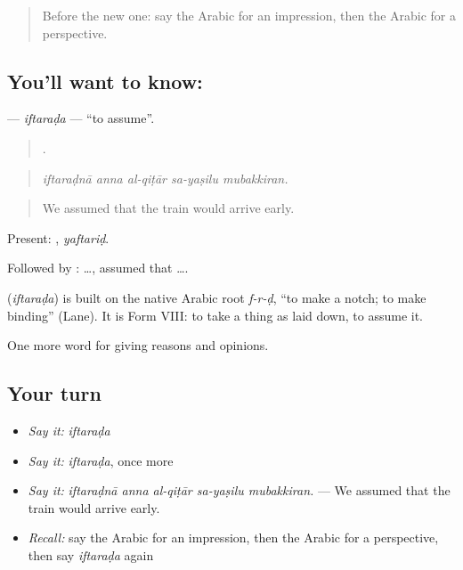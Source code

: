 \label{lesson:AR-C359-iftarada}



\begin{quote}
Before the new one: say the Arabic for an impression, then the Arabic for a perspective.
\end{quote}

\subsection*{You'll want to know: }
\textbf{} — \emph{iftaraḍa} — \textquotedblleft{}to assume\textquotedblright{}.

\begin{quote}
    .
\end{quote}

\begin{quote}
\emph{iftaraḍnā anna al-qiṭār sa-yaṣilu mubakkiran.}
\end{quote}

\begin{quote}
We assumed that the train would arrive early.
\end{quote}

Present: , \emph{yaftariḍ}.

Followed by :   …, assumed that ….

\begin{cousinweb}
\textbf{} (\emph{iftaraḍa}) is built on the native Arabic root \emph{f-r-ḍ}, \textquotedblleft{}to make a notch; to make binding\textquotedblright{} (Lane). It is Form VIII: to take a thing as laid down, to assume it.
\end{cousinweb}

\begin{grammarlens}[title={What you've built}]
One more word for giving reasons and opinions.
\end{grammarlens}

\subsection*{Your turn}
\begin{itemize}
\raggedright
  \item \emph{Say it:} \emph{iftaraḍa}
  \item \emph{Say it:} \emph{iftaraḍa}, once more
  \item \emph{Say it:} \emph{iftaraḍnā anna al-qiṭār sa-yaṣilu mubakkiran.} — We assumed that the train would arrive early.
  \item \emph{Recall:} say the Arabic for an impression, then the Arabic for a perspective, then say \emph{iftaraḍa} again
\end{itemize}

